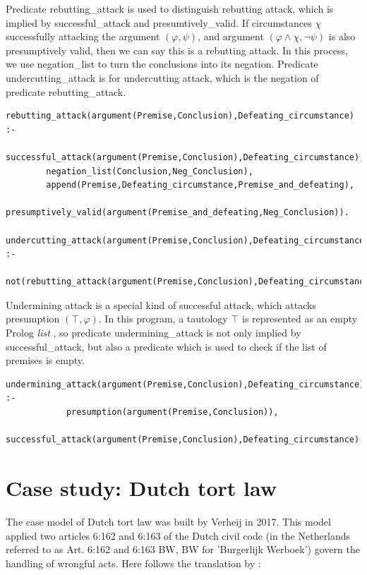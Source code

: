 \documentclass{IOS-Book-Article}
\begin{document}
Predicate {\mf rebutting\_attack} is used to distinguish rebutting attack, which is implied by {\mf successful\_attack} and {\mf presumtively\_valid}. If circumstances $\chi$ successfully attacking the argument  $(\varphi, \psi)$, and argument $(\varphi \wedge \chi, \neg \psi)$ is also presumptively valid, then we can say this is a rebutting attack. In this process, we use {\mf negation\_list} to turn the conclusions into its negation. Predicate {\mf undercutting\_attack} is for undercutting attack, which is the negation of predicate {\mf rebutting\_attack}.
\begin{lstlisting}
rebutting_attack(argument(Premise,Conclusion),Defeating_circumstance) :-
		successful_attack(argument(Premise,Conclusion),Defeating_circumstance),
		negation_list(Conclusion,Neg_Conclusion),
		append(Premise,Defeating_circumstance,Premise_and_defeating),
		presumptively_valid(argument(Premise_and_defeating,Neg_Conclusion)).

undercutting_attack(argument(Premise,Conclusion),Defeating_circumstance) :-
		not(rebutting_attack(argument(Premise,Conclusion),Defeating_circumstance)).
\end{lstlisting}

Undermining attack is a special kind of successful attack, which attacks presumption $(\top, \varphi)$. In this program, a tautology $\top$ is represented as an empty Prolog \textit{list} {\mf [ ]}, so predicate {\mf undermining\_attack} is not only implied by {\mf successful\_attack}, but also a predicate which is used to check if the list of premises is empty.
\begin{lstlisting}
undermining_attack(argument(Premise,Conclusion),Defeating_circumstance) :-
			presumption(argument(Premise,Conclusion)),
			successful_attack(argument(Premise,Conclusion),Defeating_circumstance).
\end{lstlisting}

\section{Case study: Dutch tort law}




\noindent The case model of Dutch tort law was built by Verheij in 2017\citep{Verheij2017Formalizing}. This model applied two articles 6:162 and 6:163 of the Dutch civil code (in the Netherlands referred to as Art. 6:162 and 6:163 BW, BW for 'Burgerlijk Werboek') govern the handling of wrongful acts. Here follows the translation by \citep{Betlem1993Civil}:
\end{document}
